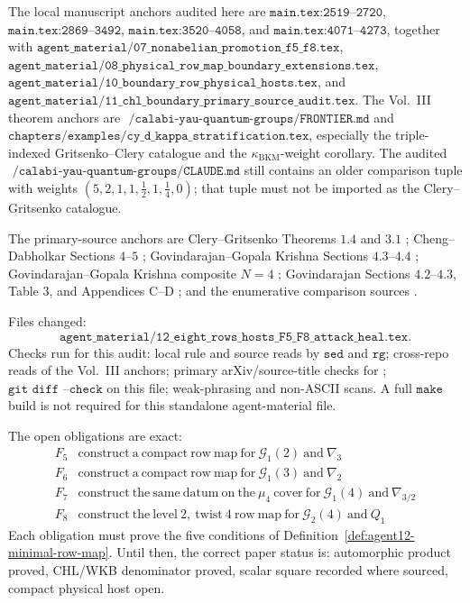 \begin{remark}
The local manuscript anchors audited here are
\(\texttt{main.tex:2519--2720}\),
\(\texttt{main.tex:2869--3492}\),
\(\texttt{main.tex:3520--4058}\), and
\(\texttt{main.tex:4071--4273}\), together with
\(\texttt{agent\_material/07\_nonabelian\_promotion\_f5\_f8.tex}\),
\(\texttt{agent\_material/08\_physical\_row\_map\_boundary\_extensions.tex}\),
\(\texttt{agent\_material/10\_boundary\_row\_physical\_hosts.tex}\), and
\(\texttt{agent\_material/11\_chl\_boundary\_primary\_source\_audit.tex}\).
The Vol.~III theorem anchors are
\(\texttt{~/calabi-yau-quantum-groups/FRONTIER.md}\) and
\(\texttt{chapters/examples/cy\_d\_kappa\_stratification.tex}\),
especially the triple-indexed Gritsenko--Clery catalogue and the
\(\kappa_{\mathrm{BKM}}\)-weight corollary.  The audited
\(\texttt{~/calabi-yau-quantum-groups/CLAUDE.md}\) still contains an
older comparison tuple with weights \((5,2,1,1,\frac12,1,\frac14,0)\);
that tuple must not be imported as the Clery--Gritsenko catalogue.

The primary-source anchors are Clery--Gritsenko Theorems \(1.4\) and
\(3.1\) \cite{GC}; Cheng--Dabholkar Sections \(4\)--\(5\)
\cite{CD09BKM}; Govindarajan--Gopala Krishna Sections \(4.3\)--\(4.4\)
\cite{GK09CHL}; Govindarajan--Gopala Krishna composite \(N=4\)
\cite{GK10Composite}; Govindarajan Sections \(4.2\)--\(4.3\), Table
\(3\), and Appendices C--D \cite{Gov11BKM}; and the enumerative
comparison sources \cite{OPand,OB,OberdieckReducedPT,BOPY,OhThomasI,
OhThomasII,BORCEA,VOISIN}.
\end{remark}

\begin{remark}
Files changed:
\[
\texttt{agent\_material/12\_eight\_rows\_hosts\_F5\_F8\_attack\_heal.tex}.
\]
Checks run for this audit: local rule and source reads by \(\texttt{sed}\)
and \(\texttt{rg}\); cross-repo reads of the Vol.~III anchors; primary
arXiv/source-title checks for \cite{GC,Gov11BKM,GK09CHL,GK10Composite,
CD09BKM,OPand,BOPY,OhThomasI,OhThomasII}; \(\texttt{git diff --check}\)
on this file; weak-phrasing and non-ASCII scans.  A full
\(\texttt{make}\) build is not required for this standalone
agent-material file.

The open obligations are exact:
\[
\begin{array}{c|l}
F_5&\mathrm{construct\ a\ compact\ row\ map\ for\ }
\mathcal G_1(2)\ \mathrm{and}\ \nabla_3\\
F_6&\mathrm{construct\ a\ compact\ row\ map\ for\ }
\mathcal G_1(3)\ \mathrm{and}\ \nabla_2\\
F_7&\mathrm{construct\ the\ same\ datum\ on\ the\ }\mu_4
\mathrm{\ cover\ for\ }\mathcal G_1(4)\ \mathrm{and}\ \nabla_{3/2}\\
F_8&\mathrm{construct\ the\ level\ }2,\ \mathrm{twist\ }4
\mathrm{\ row\ map\ for\ }\mathcal G_2(4)\ \mathrm{and}\ Q_1
\end{array}
\]
Each obligation must prove the five conditions of
Definition~\ref{def:agent12-minimal-row-map}.  Until then, the correct
paper status is: automorphic product proved, CHL/WKB denominator proved,
scalar square recorded where sourced, compact physical host open.
\end{remark}
